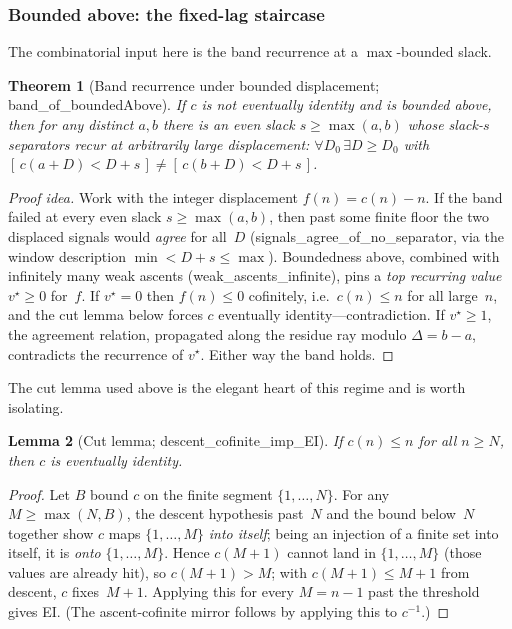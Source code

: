 \documentclass{article}
\newtheorem{theorem}{Theorem}[section]
\newtheorem{lemma}[theorem]{Lemma}
\newcommand{\us}{\discretionary{}{}{}\_\discretionary{}{}{}}
\newcommand{\lean}[1]{{\small\ttfamily #1}}
\begin{document}
\subsubsection{Bounded above: the fixed-lag staircase}
\label{sec:bounded}

The combinatorial input here is the band recurrence at a $\max$-bounded
slack.

\begin{theorem}[Band recurrence under bounded displacement;
  \lean{band\us of\us boundedAbove}]\label{thm:bandrec}
If $c$ is not eventually identity and is bounded above, then for any
distinct $a,b$ there is an \emph{even} slack $s\ge\max(a,b)$ whose
slack-$s$ separators recur at arbitrarily large displacement:
$\forall D_0\,\exists D\ge D_0$ with
$[\,c(a{+}D)<D{+}s\,]\neq[\,c(b{+}D)<D{+}s\,]$.
\end{theorem}
\begin{proof}[Proof idea]
Work with the integer displacement $f(n)=c(n)-n$. If the band failed at
every even slack $s\ge\max(a,b)$, then past some finite floor the two
displaced signals would \emph{agree} for all~$D$
(\lean{signals\us agree\us of\us no\us separator}, via the window
description $\min<D{+}s\le\max$). Boundedness above, combined with
infinitely many weak ascents (\lean{weak\us ascents\us infinite}), pins a
\emph{top recurring value} $v^\star\ge 0$ for~$f$. If $v^\star=0$ then
$f(n)\le 0$ cofinitely, i.e.\ $c(n)\le n$ for all large~$n$, and the cut
lemma below forces $c$ eventually identity---contradiction. If
$v^\star\ge 1$, the agreement relation, propagated along the residue ray
modulo $\Delta=b-a$, contradicts the recurrence of $v^\star$. Either way
the band holds.
\end{proof}

The cut lemma used above is the elegant heart of this regime and is worth
isolating.

\begin{lemma}[Cut lemma; \lean{descent\us cofinite\us imp\us EI}]\label{lem:cut}
If $c(n)\le n$ for all $n\ge N$, then $c$ is eventually identity.
\end{lemma}
\begin{proof}
Let $B$ bound $c$ on the finite segment $\{1,\dots,N\}$. For any
$M\ge\max(N,B)$, the descent hypothesis past~$N$ and the bound below~$N$
together show $c$ maps $\{1,\dots,M\}$ \emph{into itself}; being an
injection of a finite set into itself, it is \emph{onto} $\{1,\dots,M\}$.
Hence $c(M{+}1)$ cannot land in $\{1,\dots,M\}$ (those values are already
hit), so $c(M{+}1)>M$; with $c(M{+}1)\le M{+}1$ from descent, $c$
fixes~$M{+}1$. Applying this for every $M=n{-}1$ past the threshold gives
EI. (The ascent-cofinite mirror follows by applying this to $c^{-1}$.)
\end{proof}
\end{document}
